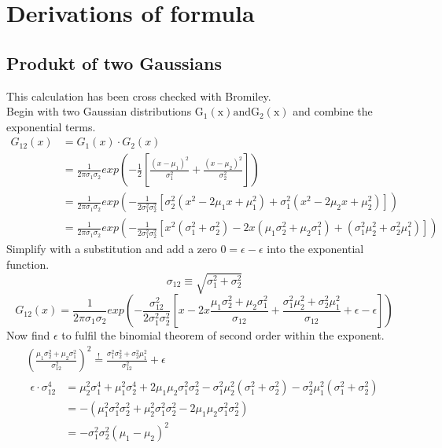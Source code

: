 \documentclass[twoside,openright]{scrreprt}
\begin{document}
\chapter{Derivations of formula}
\section{Produkt of two Gaussians}\label{GaussiansDerivation}
This calculation has been cross checked with Bromiley.\\
Begin with two Gaussian distributions $\mathrm{G_1(x) and G_2(x)}$ and combine the exponential terms.
\begin{equation*}
\begin{split}
G_{12}(x) & =  G_1(x) \cdot G_2(x) \\ 
& = \frac{1}{2\pi \sigma_1 \sigma_2}
exp\left(-\frac{1}{2}\left[\frac{\left(x-\mu_1\right)^2}{\sigma_1^2} + \frac{\left(x-\mu_2\right)^2}{\sigma_2^2} \right]\right)
\\
& = \frac{1}{2\pi \sigma_1 \sigma_2} exp \left(-\frac{1}{2\sigma_1^2 \sigma_2^2} \left[
\sigma_2^2 \left(x^2 - 2 \mu_1 x + \mu_1^2 \right) + 
\sigma_1^2 \left(x^2 - 2 \mu_2 x + \mu_2^2 \right)
\right] \right)
\\
& = \frac{1}{2\pi \sigma_1 \sigma_2} exp \left(-\frac{1}{2\sigma_1^2 \sigma_2^2} \left[
x^2(\sigma_1^2+\sigma_2^2) - 2x(\mu_1\sigma_2^2 + \mu_2\sigma_1^2) + (\sigma_1^2 \mu_2^2 + \sigma_2^2 \mu_1^2)
\right] \right)
\end{split}
\end{equation*}
Simplify with a substitution and add a zero $0 = \epsilon - \epsilon$ into the exponential function.
\begin{equation*}
\sigma_{12} \equiv \sqrt{\sigma_1^2+\sigma_2^2}
\end{equation*}
\begin{equation*}
G_{12}(x) = \frac{1}{2\pi \sigma_1 \sigma_2} exp \left(-\frac{\sigma_{12}^2}{2\sigma_1^2\sigma_2^2}\left[
x - 2x\frac{\mu_1\sigma_2^2+ \mu_2\sigma_1^2}{\sigma_{12}} + \frac{\sigma_1^2\mu_2^2 + \sigma_2^2\mu_1^2}{\sigma_{12}}
+ \epsilon - \epsilon
\right]\right)
\end{equation*}
Now find $\epsilon$ to fulfil the binomial theorem of second order within the exponent.
\begin{gather*}
\left(\frac{\mu_1 \sigma_2^2 + \mu_2\sigma_1^2}{\sigma_{12}^2}\right)^2 \stackrel{!}{=} \frac{\sigma_1^2\sigma_2^2 + \sigma_2^2\mu_1^2}{\sigma_{12}^2} + \epsilon
\\
\begin{split}
\epsilon \cdot \sigma_{12}^4  & = \mu_2^2\sigma_1^4 + \mu_1^2\sigma_2^4 + 2\mu_1\mu_2\sigma_1^2\sigma_2^2 - \sigma_1^2\mu_2^2(\sigma_1^2+ \sigma_2^2) - \sigma_2^2\mu_1^2(\sigma_1^2+ \sigma_2^2)\\
& = - (\mu_1^2\sigma_1^2\sigma_2^2 + \mu_2^2\sigma_1^2\sigma_2^2 - 2 \mu_1\mu_2\sigma_1^2\sigma_2^2)\\
& = - \sigma_1^2\sigma_2^2(\mu_1-\mu_2)^2
\end{split}
\end{gather*}
\end{document}
